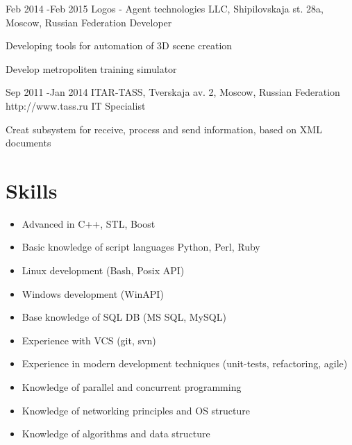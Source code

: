\documentclass[10pt]{article} %
\begin{document}

\job
{Feb 2014 -}{Feb 2015}
{Logos - Agent technologies LLC, Shipilovskaja st. 28a, Moscow, Russian Federation}
{}
{Developer}
{
\begin{itemize-noindent}
\setlength\itemsep{0em}
\item{Developing tools for automation of 3D scene creation}
\item{Develop metropoliten training simulator}
\end{itemize-noindent}
}


\job
{Sep 2011 -}{Jan 2014}
{ITAR-TASS, Tverskaja av. 2, Moscow, Russian Federation}
{http://www.tass.ru}
{IT Specialist}
{
\begin{itemize-noindent}
\setlength\itemsep{0em}
\item{Creat subsystem for receive, process and send information, based on XML documents}
\end{itemize-noindent}
}


\section{Skills}

\begin{multicols}{2}
\begin{itemize}
\setlength\itemsep{0em}
\item Advanced in C++, STL, Boost
\item Basic knowledge of script languages Python, Perl, Ruby
\item Linux development (Bash, Posix API)
\item Windows development (WinAPI)
\item Base knowledge of SQL DB (MS SQL, MySQL)
\item Experience with VCS (git, svn)
\item Experience in modern development techniques (unit-tests, refactoring, agile)
\item Knowledge of parallel and concurrent programming
\item Knowledge of networking principles and OS structure
\item Knowledge of algorithms and data structure
\end{itemize}
\end{multicols}
\end{document}
